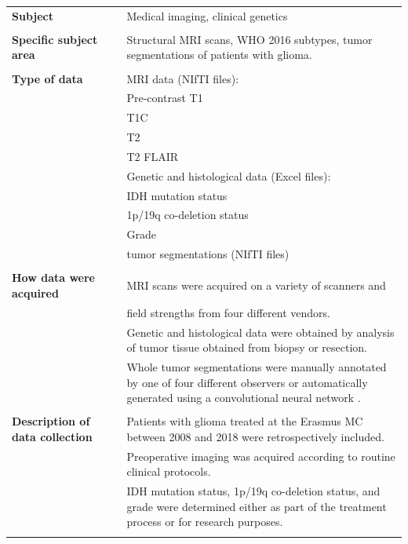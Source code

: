 \begin{table}[htbp]
\begin{tabular}{L{4cm}C{0.2cm}L{8cm}}
\toprule
\textbf{Subject} && Medical imaging, clinical genetics\\
\\
\textbf{Specific subject area}  && Structural \acrshort{MRI} scans, \acrshort{WHO} 2016 subtypes, \gls{tumor} segmentations of patients with glioma.\\
\\
\textbf{Type of data}  && \acrshort{MRI} data (NIfTI files):\\
&& \hphantom{aaaaa}Pre-contrast \acrlong{T1}\\
&& \hphantom{aaaaa}\Acrlong{T1C}\\
&& \hphantom{aaaaa}\acrlong{T2}\\
&& \hphantom{aaaaa}\acrlong{T2} FLAIR\\
&& Genetic and histological data (Excel files):\\
&&\hphantom{aaaaa}\acrshort{IDH} mutation status\\
&&\hphantom{aaaaa}1p/19q co-deletion status\\
&&\hphantom{aaaaa}Grade\\
&&\Gls{tumor} segmentations (NIfTI files)\\
\\
\textbf{How data were acquired} && \acrshort{MRI} scans were acquired on a variety of scanners and\\
&& field strengths from four different vendors.\\
&& Genetic and histological data were obtained by analysis of \gls{tumor} tissue obtained from biopsy or resection.\\
&& Whole \gls{tumor} segmentations were manually annotated by one of four different observers or automatically generated using a convolutional neural network \autocite{voortunpublishedsubtypingEGD}.\\
\\
\textbf{Description of data collection} && Patients with glioma treated at the Erasmus MC between 2008 and 2018 were retrospectively included.\\
&&Preoperative imaging was acquired according to routine clinical protocols.\\
&&\acrshort{IDH} mutation status, 1p/19q co-deletion status, and grade were determined either as part of the treatment process or for research purposes.\\
\\

\end{tabular}
\end{table}
